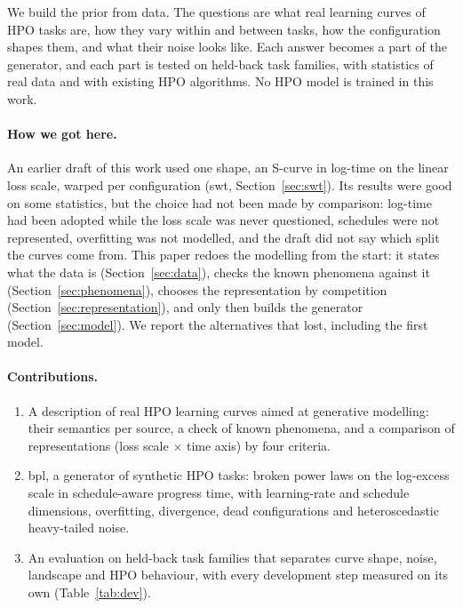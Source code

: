 \documentclass[10pt]{article}
\newcommand{\bpl}{\textsf{bpl}}
\newcommand{\swt}{\textsf{swt}}
\begin{document}
We build the prior from data. The questions are what real learning curves of HPO tasks are, how they vary within
and between tasks, how the configuration shapes them, and what their noise looks like. Each answer becomes a part
of the generator, and each part is tested on held-back task families, with statistics of real data and with
existing HPO algorithms. No HPO model is trained in this work.

\paragraph{How we got here.} An earlier draft of this work used one shape, an S-curve in log-time on the linear
loss scale, warped per configuration (\swt{}, Section~\ref{sec:swt}). Its results were good on some statistics, but
the choice had not been made by comparison: log-time had been adopted while the loss scale was never questioned,
schedules were not represented, overfitting was not modelled, and the draft did not say which split the curves
come from. This paper redoes the modelling from the start: it states what the data is
(Section~\ref{sec:data}), checks the known phenomena against it (Section~\ref{sec:phenomena}), chooses the
representation by competition (Section~\ref{sec:representation}), and only then builds the generator
(Section~\ref{sec:model}). We report the alternatives that lost, including the first model.

\paragraph{Contributions.}
\begin{enumerate}
  \item A description of real HPO learning curves aimed at generative modelling: their semantics per source, a
    check of known phenomena, and a comparison of representations (loss scale $\times$ time axis) by four criteria.
  \item \bpl{}, a generator of synthetic HPO tasks: broken power laws on the log-excess scale in schedule-aware
    progress time, with learning-rate and schedule dimensions, overfitting, divergence, dead configurations and
    heteroscedastic heavy-tailed noise.
  \item An evaluation on held-back task families that separates curve shape, noise, landscape and HPO behaviour,
    with every development step measured on its own (Table~\ref{tab:dev}).
\end{enumerate}
\end{document}
